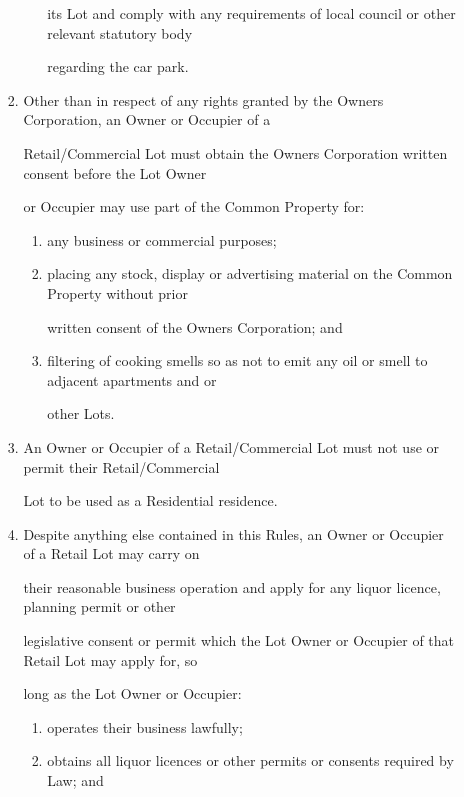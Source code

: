 \documentclass{article}
\begin{document}
\begin{enumerate}[label=\arabic*.]
\begin{enumerate}[label=\arabic{enumi}.\arabic*.]
\begin{enumerate}[label=(\arabic*)]
\begin{enumerate}[label=(\alph*)]
its Lot and comply with any requirements of local council or other relevant statutory body 

regarding the car park. 

\end{enumerate}
\item  Other than in respect of any rights granted by the Owners Corporation, an Owner or Occupier of a 

Retail/Commercial Lot must obtain the Owners Corporation written consent before the Lot Owner 

or Occupier may use part of the Common Property for: 

\newpage

\begin{enumerate}[label=(\alph*)]
\item  any business or commercial purposes; 

\item  placing any stock, display or advertising material on the Common Property without prior 

written consent of the Owners Corporation; and 

\item  filtering of cooking smells so as not to emit any oil or smell to adjacent apartments and or 

other Lots. 

\end{enumerate}
\item  An Owner or Occupier of a Retail/Commercial Lot must not use or permit their Retail/Commercial 

Lot to be used as a Residential residence. 

\item  Despite anything else contained in this Rules, an Owner or Occupier of a Retail Lot may carry on 

their reasonable business operation and apply for any liquor licence, planning permit or other 

legislative consent or permit which the Lot Owner or Occupier of that Retail Lot may apply for, so 

long as the Lot Owner or Occupier: 

\begin{enumerate}[label=(\alph*)]
\item  operates their business lawfully; 

\item  obtains all liquor licences or other permits or consents required by Law; and 


\end{enumerate}
\end{enumerate}
\end{enumerate}
\end{enumerate}
\end{document}
